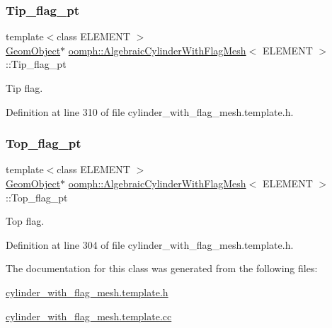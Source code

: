 \subsubsection{\texorpdfstring{Tip\+\_\+flag\+\_\+pt}{Tip\_flag\_pt}}
{\footnotesize\ttfamily template$<$class E\+L\+E\+M\+E\+NT $>$ \\
\hyperlink{classoomph_1_1GeomObject}{Geom\+Object}$\ast$ \hyperlink{classoomph_1_1AlgebraicCylinderWithFlagMesh}{oomph\+::\+Algebraic\+Cylinder\+With\+Flag\+Mesh}$<$ E\+L\+E\+M\+E\+NT $>$\+::Tip\+\_\+flag\+\_\+pt\hspace{0.3cm}{\ttfamily [protected]}}



Tip flag. 



Definition at line 310 of file cylinder\+\_\+with\+\_\+flag\+\_\+mesh.\+template.\+h.

\mbox{\label{classoomph_1_1AlgebraicCylinderWithFlagMesh_a326e4789fe96b3052a8beb51ec9e94d0}} 
\subsubsection{\texorpdfstring{Top\+\_\+flag\+\_\+pt}{Top\_flag\_pt}}
{\footnotesize\ttfamily template$<$class E\+L\+E\+M\+E\+NT $>$ \\
\hyperlink{classoomph_1_1GeomObject}{Geom\+Object}$\ast$ \hyperlink{classoomph_1_1AlgebraicCylinderWithFlagMesh}{oomph\+::\+Algebraic\+Cylinder\+With\+Flag\+Mesh}$<$ E\+L\+E\+M\+E\+NT $>$\+::Top\+\_\+flag\+\_\+pt\hspace{0.3cm}{\ttfamily [protected]}}



Top flag. 



Definition at line 304 of file cylinder\+\_\+with\+\_\+flag\+\_\+mesh.\+template.\+h.



The documentation for this class was generated from the following files\+:\begin{DoxyCompactItemize}
\item 
\hyperlink{cylinder__with__flag__mesh_8template_8h}{cylinder\+\_\+with\+\_\+flag\+\_\+mesh.\+template.\+h}\item 
\hyperlink{cylinder__with__flag__mesh_8template_8cc}{cylinder\+\_\+with\+\_\+flag\+\_\+mesh.\+template.\+cc}\end{DoxyCompactItemize}
